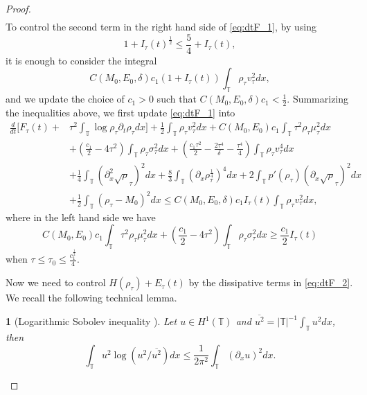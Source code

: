 \documentclass[leqno]{amsart}
\theoremstyle{plain}
\theoremstyle{definition}
\theoremstyle{remark}
\theoremstyle{plain}
\newtheorem{lem}[thm]{\protect\lemmaname}
\theoremstyle{plain}
\providecommand{\lemmaname}{Lemma}
\def\T{{\mathbb T}}%
\def\d{{\partial}}
\numberwithin{equation}{section}
\begin{document}
\begin{proof}
\begin{align*}
\end{align*}
To control the second term in the right hand side of \eqref{eq:dtF_1}, by using
\[
1+I_\tau(t)^\frac12\leq \frac{5}{4}+I_\tau(t),
\]
it is enough to consider the integral
\[
C(M_0,E_0,\delta)c_1(1+I_\tau(t))\int_\T \rho_\tau v_\tau^2dx,
\]
and we update the choice of $c_1>0$ such that $C(M_0,E_0,\delta)c_1<\frac{1}{2}$. Summarizing the inequalities above, we first update \eqref{eq:dtF_1} into
\begin{equation}\label{eq:dtF_2}
\begin{aligned}
\frac{d}{dt}[F_\tau(t)+&\tau^2\int_\T\log\rho_\tau\d_t\rho_\tau dx]+\frac{1}{2}\int_\T\rho_\tau v^2_\tau dx+C(M_0,E_0)c_1 \int_\T\tau^2\rho_\tau\mu_\tau^2 dx\\
&+\left(\frac{c_1}{2}-4\tau^2\right)\int_\T\rho_\tau\sigma_\tau^2dx+\left(\frac{c_1\tau^2}{2}-\frac{2\tau^4}{\delta}-\frac{\tau^4}{4}\right)\int_\T \rho_\tau v_\tau^4 dx\\
&+\frac14\int_\T(\d_x^2\sqrt\rho_\tau)^2dx+\frac{8}{3}\int_\T(\d_x\rho_\tau^\frac14)^4dx
+2\int_\T p'(\rho_\tau)(\d_x\sqrt\rho_\tau)^2dx\\
&+\frac12\int_\T(\rho_\tau-M_0)^2dx\leq  C(M_0,E_0,\delta)c_1 I_\tau(t)\int_\T \rho_\tau v_\tau^2dx,
\end{aligned}
\end{equation}
where in the left hand side we have
\[
C(M_0,E_0)c_1 \int_\T\tau^2\rho_\tau\mu_\tau^2 dx+\left(\frac{c_1}{2}-4\tau^2\right)\int_\T\rho_\tau\sigma_\tau^2dx\geq \frac{c_1}{2} I_\tau(t)
\]
when $\tau\leq \tau_0\leq \frac{c_1^\frac12}{4}$.

Now we need to control $H(\rho_\tau)+E_\tau(t)$ by the dissipative terms in \eqref{eq:dtF_2}. We recall the following technical lemma.

\begin{lem}[Logarithmic Sobolev inequality \cite{DGJ}]\label{lem:logineq}
Let $u\in H^1(\T)$ and $\overline{u^2}=|\T|^{-1}\int_\T u^2 dx$, then
\begin{equation}\label{eq:logineq}
\int_\T u^2\log(u^2/\overline{u^2})dx\leq \frac{1}{2\pi^2}\int_\T (\d_x u)^2dx.
\end{equation}
\end{lem}


\end{proof}
\end{document}
